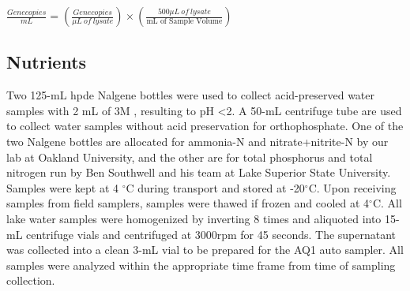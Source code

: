 \begin{center}
	$\frac{Genecopies}{mL} = (\frac{Genecopies}{\mu L \: of \: lysate}) \times (\frac{500\mu L \: of \: lysate}{\text{mL of Sample Volume}})$
\end{center}

\subsection{Nutrients}

Two 125-mL \gls{hpde} Nalgene bottles were used to collect acid-preserved water samples with 2 mL of 3M , resulting to pH \textless 2. A 50-mL centrifuge tube are used to collect water samples without acid preservation for orthophosphate. One of the two Nalgene bottles are allocated for ammonia-N and nitrate+nitrite-N by our lab at Oakland University, and the other are for total phosphorus and total nitrogen run by Ben Southwell and his team at Lake Superior State University.  Samples were kept  at 4 $^\circ$C during transport and stored at -20$^\circ$C. Upon receiving samples from field samplers, samples were thawed if frozen and cooled at 4$^\circ$C. All lake water samples were homogenized by inverting 8 times and aliquoted into 15-mL centrifuge vials and centrifuged at 3000rpm for 45 seconds. The supernatant was collected into a clean 3-mL vial to be prepared for the AQ1 auto sampler. All samples were analyzed within the appropriate time frame from time of sampling collection.

